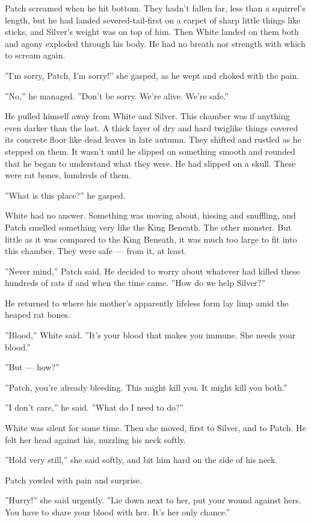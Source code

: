 \documentclass[12pt]{book}
\begin{document}
Patch screamed when he hit bottom. They hadn't fallen far, less than a squirrel's length, but he had landed severed-tail-first on a carpet of sharp little things like sticks, and Silver's weight was on top of him. Then White landed on them both and agony exploded through his body. He had no breath nor strength with which to scream again.

''I'm sorry, Patch, I'm sorry!'' she gasped, as he wept and choked with the pain.

''No,'' he managed. ''Don't be sorry. We're alive. We're safe.''

He pulled himself away from White and Silver. This chamber was if anything even darker than the last. A thick layer of dry and hard twiglike things covered its concrete floor like dead leaves in late autumn. They shifted and rustled as he stepped on them. It wasn't until he slipped on something smooth and rounded that he began to understand what they were. He had slipped on a skull. These were rat bones, hundreds of them.

''What is this place?'' he gasped.

White had no answer. Something was moving about, hissing and snuffling, and Patch smelled something very like the King Beneath. The other monster. But little as it was compared to the King Beneath, it was much too large to fit into this chamber. They were safe ---
from it, at least. 

''Never mind,'' Patch said. He decided to worry about whatever had killed these hundreds of rats if and when the time came. ''How do we help Silver?''

He returned to where his mother's apparently lifeless form lay limp amid the heaped rat bones.

''Blood,'' White said. ''It's your blood that makes you immune. She needs your blood.''

''But ---
how?''

''Patch, you're already bleeding. This might kill you. It might kill you both.''

''I don't care,'' he said. ''What do I need to do?''

White was silent for some time. Then she moved, first to Silver, and to Patch. He felt her head against his, nuzzling his neck softly.

''Hold very still,'' she said softly, and bit him hard on the side of his neck.

Patch yowled with pain and surprise.

''Hurry!'' she said urgently. ''Lie down next to her, put your wound against hers. You have to share your blood with her. It's her only chance.''
\end{document}
